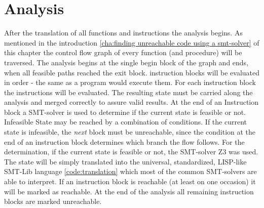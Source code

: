 \section{Analysis}
\label{sec:analysis}
After the translation of all functions and instructions the analysis begins. As mentioned in the introduction \ref{cha:finding unreachable code using a smt-solver} of this chapter the control flow graph of every function (and procedure) will be traversed. The analysis begins at the single begin block of the graph and ends, when all feasible paths reached the exit block. instruction blocks will be evaluated in order - the same as a program would execute them. 
For each instruction block the instructions will be evaluated. The resulting state must be carried along the analysis and merged correctly to assure valid results. At the end of an Instruction block a SMT-solver is used to determine if the current state is feasible or not. Infeasible State may be reached by a combination of conditions. If the current state is infeasible, the \emph{next} block must be unreachable, since the condition at the end of an instruction block determines which branch the flow follows. 
For the determination, if the current state is feasible or not, the SMT-solver Z3\cite{demouraZ3EfficientSMT2008} was used. The state will be simply translated into the universal, standardized, LISP-like SMT-Lib language \ref{code:translation} which most of the common SMT-solvers are able to interpret. 
If an instruction block is reachable (at least on one occasion) it will be marked as reachable. At the end of the analysis all remaining instruction blocks are marked unreachable.

